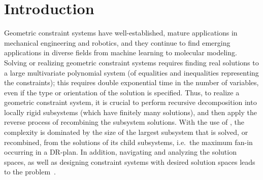 \section{Introduction}
\label{sec:intro}

\newcommand{\seedefs}{(formally defined in \ref{sec:appendix:defs})}
\newcommand{\seedefsb}{(see \ref{sec:appendix:defs} for definitions)}
\newcommand{\seedefsc}{See \ref{sec:appendix:defs} for formal definitions}
\newcommand{\seedefsd}{see \ref{sec:appendix:defs} for definitions}
\newcommand{\seedefsprelim}{(formally defined in Section \ref{sec:prelim:defs})}



Geometric constraint systems have well-established, mature applications in mechanical engineering and  robotics, and they continue to find emerging applications in diverse fields from machine learning to molecular modeling.  Solving or realizing geometric constraint systems requires finding real solutions to a large multivariate polynomial system (of equalities and inequalities representing the constraints); this requires double exponential time in the number of variables, even if the type or orientation of the solution is specified.
Thus, to realize a geometric constraint system, it is crucial to perform recursive decomposition into locally rigid subsystems (which have finitely many solutions), and then apply the reverse process of recombining the subsystem solutions.
With the use of , the complexity is dominated by the size of the largest subsystem that is solved, or recombined, from the solutions of its child subsystems, i.e.\ the maximum fan-in occurring in a DR-plan.
In addition, navigating and analyzing the solution spaces, as well as designing constraint systems with desired solution spaces leads to the  problem~\cite{sitharam2005combinatorial, hoffman2001decompositionI, hoffman2001decompositionII}. 

